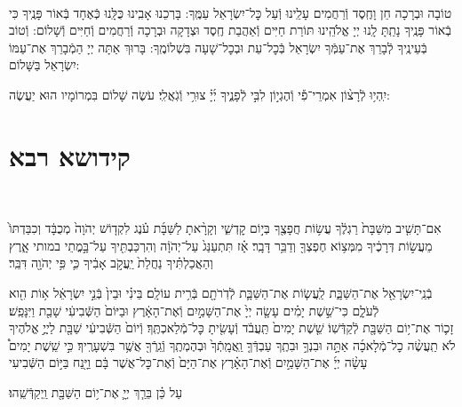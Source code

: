 \documentclass[twoside, openany, parskip=half, 11pt]{book}
\begin{document}
\shatz\\
טוֹבָה וּבְרָכָה חֵן וָחֶֽסֶד וְֿרַחֲמִים עָלֵֽינוּ וְֿעַל כׇּל־יִשְׂרָאֵל עַמֶּֽךָ: בָּרְכֵנוּ אָבִֽינוּ כֻּלָּֽנוּ כְּֿאֶחָד בְּֿאוֹר פָּנֶֽיךָ כִּי בְֿאוֹר פָּנֶֽיךָ נָתַֽתָּ לָֽנוּ יְיָ אֱלֹהֵֽינוּ תּוֹרַת חַיִּים וְֿאַהֲבַת חֶֽסֶד וּצְדָקָה וּבְרָכָה וְֿרַחֲמִים וְֿחַיִּים וְֿשָׁלוֹם: וְֿטוֹב בְּֿעֵינֶֽיךָ לְֿבָרֵךְ אֶת־עַמְּֿךָ יִשְׂרָאֵל בְּֿכׇל־עֵת וּבְכׇל־שָׁעָה בִּשְׁלוֹמֶֽךָ: בָּרוּךְ אַתָּה יְיָ הַמְֿבָרֵךְ אֶת־עַמּוֹ יִשְׂרָאֵל בַּשָּׁלוֹם:

יִֽהְי֥וּ לְֿרָצ֨וֹן אִמְרֵי־פִ֡י וְֿהֶגְי֣וֹן לִבִּ֣י לְֿפָנֶ֑יךָ יְ֜יָ֗ צוּרִ֥י וְֿגֹֽאֲלִֽי׃ עֹשֶׂה שָׁלוֹם בִּמְרוֹמָיו הוּא יַעֲשֶׂה:

\vfill



\nextpage

\siyyumshabbatYT

\mournerskaddish

\adonolam

\chapter[קידושא רבא ליו״ט]{ קידושא רבא }

\\\begin{footnotesize}
	אִם־תָּשִׁ֤יב מִשַּׁבָּת֙ רַגְלֶ֔ךָ עֲשׂ֥וֹת חֲפָצֶ֖ךָ בְּי֣וֹם קׇדְשִׁ֑י וְקָרָ֨אתָ לַשַּׁבָּ֜ת עֹ֗נֶג לִקְד֤וֹשׁ יְהֹוָה֙ מְכֻבָּ֔ד וְכִבַּדְתּוֹ֙ מֵעֲשׂ֣וֹת דְּרָכֶ֔יךָ מִמְּצ֥וֹא חֶפְצְךָ֖ וְדַבֵּ֥ר דָּבָֽר׃ אָ֗ז תִּתְעַנַּג֙ עַל־יְהֹוָ֔ה וְהִרְכַּבְתִּ֖יךָ עַל־בָּ֣מֳתֵי במותי אָ֑רֶץ וְהַאֲכַלְתִּ֗יךָ נַחֲלַת֙ יַֽעֲקֹ֣ב אָבִ֔יךָ כִּ֛י פִּ֥י יְהֹוָ֖ה דִּבֵּֽר׃ 
	
	בְֿנֵֽי־יִשְׂרָאֵ֖ל אֶת־הַשַּׁבָּ֑ת לַֽעֲשׂ֧וֹת אֶת־הַשַּׁבָּ֛ת לְֿדֹֽרֹתָ֖ם בְּֿרִ֥ית עוֹלָֽם׃ בֵּינִ֗י וּבֵין֙ בְּֿנֵ֣י יִשְׂרָאֵ֔ל א֥וֹת הִ֖וא לְֿעֹלָ֑ם כִּי־שֵׁ֣שֶׁת יָמִ֗ים עָשָׂ֤ה יְיָ֙ אֶת־הַשָּׁמַ֣יִם וְֿאֶת־הָאָ֔רֶץ וּבַיּוֹם֙ הַשְּֿׁבִיעִ֔י שָׁבַ֖ת וַיִּנָּפַֽשׁ׃\\
	זָכ֛וֹר אֶת־י֥וֹם הַשַּׁבָּ֖ת לְֿקַדְּֿשֽׁוֹ׃ שֵׁ֤שֶׁת יָמִים֙ תַּֽעֲבֹ֔ד וְֿעָשִׂ֖יתָ כׇּל־מְֿלַאכְתֶּֽךָ׃ וְֿיוֹם֙ הַשְּֿׁבִיעִ֔י שַׁבָּ֖ת לַיֽיֳ֣ אֱלֹהֶיךָ לֹא תַֽעֲשֶׂ֨ה כׇל־מְֿלָאכָ֜ה אַתָּ֣ה וּבִנְךָ֣ וּבִתֶֽךָ עַבְדְּֿךָ֤ וַֽאֲמָֽתְֿךָ֙ וּבְהֶמְתֶֽךָ וְֿגֵֽרְֿךָ֖ אֲשֶׁ֥ר בִּשְׁעָרֶֽיךָ׃ כִּ֣י שֵֽׁשֶׁת יָמִים֩ עָשָׂ֨ה יְיָ֜ אֶת־הַשָּׁמַ֣יִם וְֿאֶת־הָאָ֗רֶץ אֶת־הַיָּם֙ וְֿאֶת־כׇּל־אֲשֶׁר בָּ֔ם וַיָּ֖נַח בַּיּ֣וֹם הַשְּֿׁבִיעִי\\	\end{footnotesize} עַל כֵּ֗ן בֵּרַ֧ךְ יְיָ֛ אֶת־י֥וֹם הַשַּׁבָּ֖ת וַֽיְקַדְּֿשֵֽׁהוּ׃
	
\end{document}
